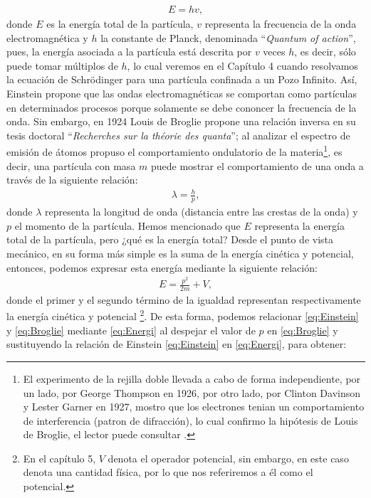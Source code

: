 \documentclass[12pt]{article}
\theoremstyle{definition}
\begin{document}
\begin{align}
    E =  hv,
    \label{eq:Einstein}
\end{align}
donde $E$ es la energía total de la partícula, $v$ representa la frecuencia de la onda electromagnética y $h$ la constante de Planck, denominada ``\textit{Quantum of action}'', pues, la energía asociada a la partícula está descrita por $v$ veces $h$, es decir, sólo puede tomar múltiplos de $h$, lo cual veremos en el Capítulo 4 cuando resolvamos la ecuación de Schrödinger para una partícula confinada a un Pozo Infinito.  Así, Einstein propone que las ondas electromagnéticas se comportan como partículas en determinados procesos porque solamente se debe cononcer la frecuencia de la onda. Sin embargo, en 1924 Louis de Broglie propone una relación inversa en su tesis doctoral ``\textit{Recherches sur la théorie des quanta}''; al analizar el espectro de emisión de átomos propuso el comportamiento ondulatorio de la materia\footnote{El experimento de la rejilla doble llevada a cabo de forma independiente, por un lado, por George Thompson en 1926, por otro lado, por Clinton Davinson y Lester Garner en 1927, mostro que los electrones tenian un comportamiento de interferencia (patron de difracción), lo cual confirmo la hipótesis de Louis de Broglie, el lector puede consultar \cite{FeyLectures}.}, es decir, una partícula con masa $m$ puede mostrar el comportamiento de una onda a través de la siguiente relación:
\begin{align}
    \lambda = \frac{h}{p},
    \label{eq:Broglie}
\end{align}
donde $\lambda$ representa la longitud de onda (distancia entre las crestas de la onda) y $p$ el momento de la partícula. Hemos mencionado que $E$ representa la energía total de la partícula, pero ¿qué es la energía total? Desde el punto de vista mecánico, en su forma más simple es la suma de la energía cinética y potencial, entonces, podemos expresar esta energía mediante la siguiente relación: 
\begin{align}
    E = \frac{p^2}{2m} + V,
    \label{eq:Energi}
\end{align}
donde el primer y el segundo término de la igualdad representan respectivamente la energía cinética y potencial \footnote{ En el capítulo 5, $V$ denota el operador potencial, sin embargo, en este caso denota una cantidad física, por lo que nos referiremos a él como el potencial.}. De esta forma, podemos relacionar \eqref{eq:Einstein} y \eqref{eq:Broglie} mediante \eqref{eq:Energi} al despejar el valor de $p$ en \eqref{eq:Broglie} y sustituyendo la relación de Einstein \eqref{eq:Einstein} en \eqref{eq:Energi}, para obtener:
\end{document}
